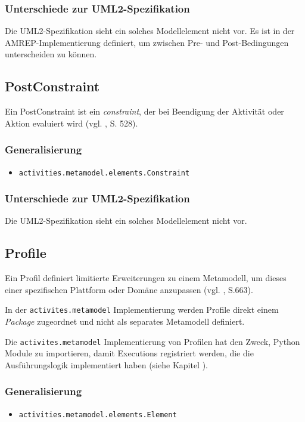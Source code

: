 \subsubsection{Unterschiede zur UML2-Spezifikation}
Die UML2-Spezifikation sieht ein solches Modellelement nicht vor. Es ist in der AMREP-Implementierung definiert, um zwischen Pre- und Post-Bedingungen unterscheiden zu können.


\subsection{PostConstraint}
Ein PostConstraint ist ein \emph{constraint}, der bei Beendigung der Aktivität oder Aktion evaluiert wird (vgl. \citep{RumbaughJacobsonBooch2005}, S. 528).

\subsubsection{Generalisierung}
\begin{itemize}
\item \texttt{activities.metamodel.elements.Constraint}
\end{itemize}

\subsubsection{Unterschiede zur UML2-Spezifikation}
Die UML2-Spezifikation sieht ein solches Modellelement nicht vor.


\subsection{Profile}
\label{meta-profile}
Ein Profil definiert limitierte Erweiterungen zu einem Metamodell, um dieses einer spezifischen Plattform oder Domäne anzupassen (vgl. \citep{OMG2009}, S.663).

In der \texttt{activites.metamodel} Implementierung werden Profile direkt einem \emph{Package} zugeordnet und nicht als separates Metamodell definiert.

Die \texttt{activites.metamodel} Implementierung von Profilen hat den Zweck, Python Module zu importieren, damit Executions registriert werden, die die Ausführungslogik implementiert haben (siehe Kapitel ).

\subsubsection{Generalisierung}
\begin{itemize}
\item \texttt{activities.metamodel.elements.Element}
\end{itemize}

